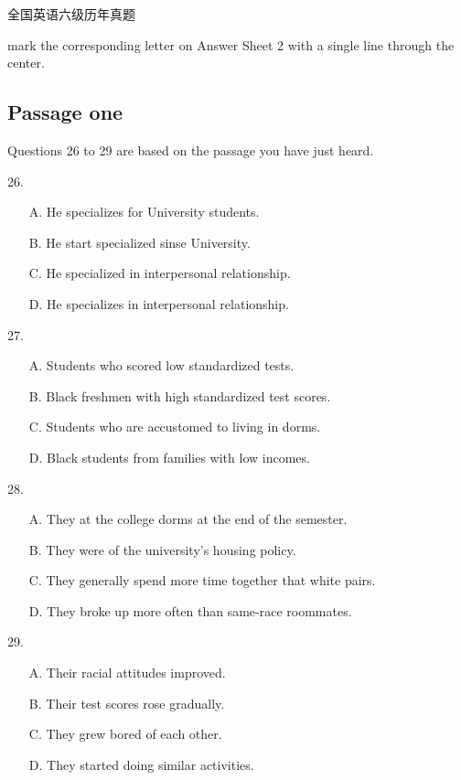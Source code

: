 \documentclass[UTF8,11pt]{ctexart}
\begin{document}
全国英语六级历年真题


mark the corresponding letter on Answer Sheet 2 with a single line through the center.


\subsection*{\textbf{Passage one}}


Questions 26 to 29 are based on the passage you have just heard.


26.


\begin{itemize}[leftmargin=2em,itemsep=.2em,topsep=.4em]\item[A.] He specializes for University students.
\item[B.] He start specialized sinse University.
\item[C.] He specialized in interpersonal relationship.
\item[D.] He specializes in interpersonal relationship.
\end{itemize}

27.


\begin{itemize}[leftmargin=2em,itemsep=.2em,topsep=.4em]\item[A.] Students who scored low standardized tests.
\item[B.] Black freshmen with high standardized test scores.
\item[C.] Students who are accustomed to living in dorms.
\item[D.] Black students from families with low incomes.
\end{itemize}

28.


\begin{itemize}[leftmargin=2em,itemsep=.2em,topsep=.4em]\item[A.] They at the college dorms at the end of the semester.
\item[B.] They were of the university’s housing policy.
\item[C.] They generally spend more time together that white pairs.
\item[D.] They broke up more often than same-race roommates.
\end{itemize}

29.


\begin{itemize}[leftmargin=2em,itemsep=.2em,topsep=.4em]\item[A.] Their racial attitudes improved.
\item[B.] Their test scores rose gradually.
\item[C.] They grew bored of each other.
\item[D.] They started doing similar activities.
\end{itemize}
\end{document}
